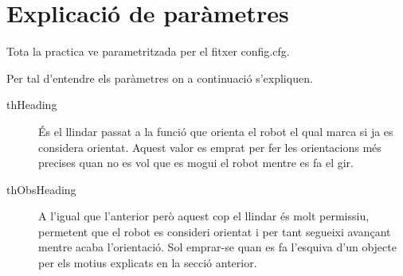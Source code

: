 \section{Explicació de paràmetres}

Tota la practica ve parametritzada per el fitxer config.cfg.

Per tal d'entendre els paràmetres on a continuació s'expliquen.

\begin{description}
  \item[thHeading] És el llindar passat a la funció que orienta el robot el qual marca si ja es considera orientat.
Aquest valor es emprat per fer les orientacions més precises quan no es vol que es mogui el robot mentre es fa el gir.
  \item[thObsHeading] A l'igual que l'anterior però aquest cop el llindar és molt permissiu, permetent que el robot
es consideri orientat i per tant segueixi avançant mentre acaba l'orientació. Sol emprar-se quan es fa l'esquiva
d'un objecte per els motius explicats en la secció anterior.


\end{description}
